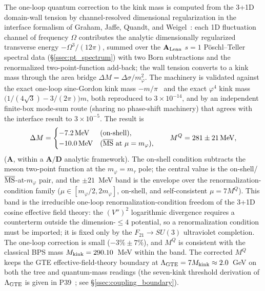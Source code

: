 \documentclass[11pt]{article}
\theoremstyle{remark}
\newcommand{\Mkink}{M_{\rm kink}}
\newcommand{\mtau}{m_\tau}
\newcommand{\CatA}{\textbf{A}}
\newcommand{\CatAL}{\ensuremath{\textbf{A}_{\rm Lean}}}
\newcommand{\CatAD}{\textbf{A/D}}
\begin{document}
The one-loop quantum correction to the kink mass is computed from the 3+1D
domain-wall tension by channel-resolved dimensional regularization in the
interface formalism of Graham, Jaffe, Quandt, and
Weigel~\cite{GrahamJaffeQuandtWeigel2001}: each 1D fluctuation channel of
frequency $\Omega$ contributes the analytic dimensionally regularized
transverse energy $-\Omega^3/(12\pi)$, summed over the $\CatAL$ $s=1$
Pöschl--Teller spectral data (\S\ref{ssec:pt_spectrum}) with two Born
subtractions and the renormalized two-point-function add-back; the wall
tension converts to a kink mass through the area bridge
$\Delta M = \Delta\sigma/m_\varphi^2$.  The machinery is validated against
the exact one-loop sine-Gordon kink mass
$-m/\pi$~\cite{DashenHasslacherNeveu1975} and the exact $\varphi^4$ kink mass
$\bigl(1/(4\sqrt{3}) - 3/(2\pi)\bigr)m$, both reproduced to $3\times10^{-14}$,
and by an independent finite-box mode-sum route (sharing no phase-shift
machinery) that agrees with the interface result to $3\times10^{-5}$.
The result is
\begin{equation}
  \Delta M = \begin{cases}
    -7.2\,\text{MeV} & \text{(on-shell)},\\
    -10.0\,\text{MeV} & \text{($\overline{\rm MS}$ at $\mu = m_\varphi$)},
  \end{cases}
  \qquad
  M^Q = 281 \pm 21\,\text{MeV},
  \label{eq:quantum_kink_mass}
\end{equation}
($\CatA$, within a $\CatAD$ analytic framework).  The on-shell condition
subtracts the meson two-point function at the $m_\varphi = \mtau$ pole; the
central value is the on-shell/$\overline{\rm MS}$-at-$m_\varphi$ pair, and
the $\pm 21$~MeV band is the envelope over the renormalization-condition
family ($\mu \in [m_\varphi/2, 2m_\varphi]$, on-shell, and self-consistent
$\mu = 7M^Q$).  This band is the irreducible one-loop
renormalization-condition freedom of the 3+1D cosine effective field theory:
the $(V'')^2$ logarithmic divergence requires a counterterm outside the
dimension-$\leq4$ potential, so a renormalization condition must be imported;
it is fixed only by the $F_{21}\to SU(3)$ ultraviolet completion.  The
one-loop correction is small ($-3\% \pm 7\%$), and $M^Q$ is consistent with
the classical BPS mass $\Mkink = 290.10$~MeV within the band.  The corrected
$M^Q$ keeps the GTE effective-field-theory boundary at
$\Lambda_{\rm GTE} = 7\Mkink \approx 2.0$~GeV on both the tree and
quantum-mass readings (the seven-kink threshold derivation of
$\Lambda_{\rm GTE}$ is given in P39~\cite{SpivackGTEQCDStructure}; see
\S\ref{ssec:coupling_boundary}).
\end{document}
